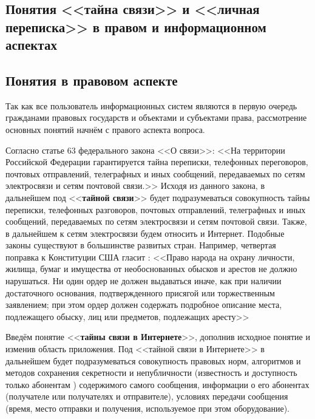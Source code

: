 \parindent=1cm %
\begin{center}
		
		\section{Понятия <<тайна связи>> и <<личная переписка>> в правом и информационном аспектах}
		
\end{center}

\subsection{Понятия в правовом аспекте} 

Так как все пользователь информационных систем являются в первую очередь гражданами правовых государств и объектами и субъектами права, рассмотрение основных понятий начнём с правого аспекта вопроса.

Согласно статье 63 федерального закона <<О связи>>: %
<<На территории Российской Федерации гарантируется тайна переписки, телефонных переговоров, почтовых отправлений, телеграфных и иных сообщений, передаваемых по сетям электросвязи и сетям почтовой связи.>> Исходя из данного закона, в дальнейшем под <<\textbf{тайной связи}>>  будет подразумеваться совокупность тайны переписки, телефонных разговоров, почтовых отправлений, телеграфных и иных сообщений, передаваемых по сетям электросвязи и сетям почтовой связи. Также, в дальнейшем к сетям электросвязи будем относить и Интернет. Подобные законы существуют в большинстве развитых стран. Например, четвертая поправка  к Конституции США  гласит : <<Право народа на охрану личности, жилища, бумаг и имущества от необоснованных обысков и арестов не должно нарушаться. Ни один ордер не должен выдаваться иначе, как при наличии достаточного основания, подтвержденного присягой или торжественным заявлением; при этом ордер должен содержать подробное описание места, подлежащего обыску, лиц или предметов, подлежащих аресту>> %

Введём понятие <<\textbf{тайны связи в Интернете}>>, дополнив исходное понятие и изменив область приложения. Под <<тайной связи в Интернете>> в дальнейшем будет подразумеваться совокупность правовых норм, алгоритмов и методов сохранения секретности и  непубличности (известность и доступность только абонентам ) содержимого самого сообщения, информации о его абонентах (получателе или получателях и отправителе), условиях передачи сообщения (время, место отправки и получения, используемое при этом оборудование). 

